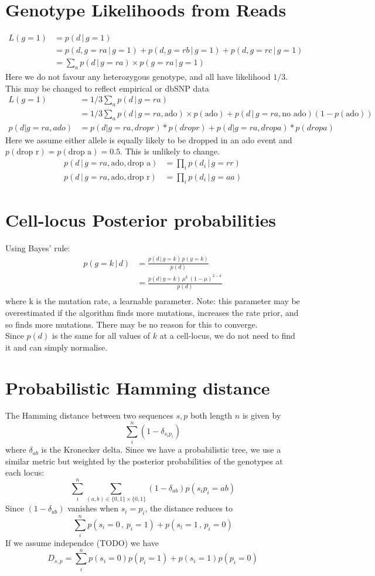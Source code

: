 \documentclass{article}
\begin{document}
\section{Genotype Likelihoods from Reads}
\begin{align*}
L(g=1) &= p(d\,|\,g=1)\\
&=p(d, g=ra \,|\, g=1) + p(d, g=rb \,|\, g=1) + p(d, g=rc \,|\, g=1)\\
&= \sum_a p(d \,|\, g=ra) \times p(g=ra \,|\, g=1)
\end{align*}
Here we do not favour any heterozygous genotype, and all have likelihood $1/3$. This may be changed to reflect empirical or dbSNP data
\begin{align*}
L(g=1) &= 1/3 \sum_a p(d \,|\, g=ra)\\
&= 1/3 \sum_a p(d \,|\, g=ra, \text{ado}) \times p(\text{ado}) + p(d \,|\, g=ra, \text{no ado})(1-p(\text{ado}))\\
p(d|g=ra, ado) &= p(d|g=ra, drop r) * p(drop r) + p(d|g=ra, drop a) * p(drop a)
\end{align*}
Here we assume either allele is equally likely to be dropped in an ado event and $p(\text{drop r}) = p(\text{drop a}) = 0.5$. This is unlikely to change.
\begin{align*}
p(d \,|\, g=ra, \text{ado}, \text{drop a}) &= \prod_i p(d_i \,|\, g=rr)\\
p(d \,|\, g=ra, \text{ado}, \text{drop r}) &= \prod_i p(d_i \,|\, g=aa)
\end{align*}

\section{Cell-locus Posterior probabilities}
Using Bayes' rule:
\begin{align*}
p(g=k\,|\, d) &= \frac{p(d\,|\,g=k)\,p(g=k)}{p(d)}\\
&= \frac{p(d\,|\,g=k)\,\mu^k\,(1-\mu)^{2-k}}{p(d)}\\
\end{align*}
where k is the mutation rate, a learnable parameter. Note: this parameter may be overestimated if the algorithm finds more mutations, increases the rate prior, and so finds more mutations. There may be no reason for this to converge.\\
Since $p(d)$ is the same for all values of $k$ at a cell-locus, we do not need to find it and can simply normalise.

\section{Probabilistic Hamming distance}
The Hamming distance between two sequences $s,p$ both length $n$ is given by \[\sum\limits_i^n (1-\delta_{s_ip_i})\] where $\delta_{ab}$ is the Kronecker delta.
Since we have a probabilistic tree, we use a similar metric but weighted by the posterior probabilities of the genotypes at each locus:
\[\sum\limits_i^n \sum\limits_{(a,b)\in\{0,1\}\times\{0,1\}}(1-\delta_{ab})p(s_ip_i = ab)\]
Since $(1-\delta_{ab})$ vanishes when $s_i = p_i$, the distance reduces to
\[\sum\limits_i^n p(s_i = 0\,,\,p_i=1)+p(s_i=1\,,\,p_i=0)\]
If we assume independce (TODO) we have
\[D_{s,p} = \sum\limits_i^n p(s_i = 0)p(p_i=1)+p(s_i=1)p(p_i=0)\]
\end{document}

